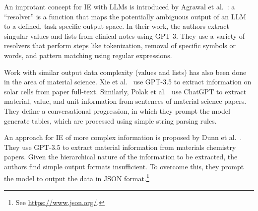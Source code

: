 An improtant concept for IE with LLMs is introduced by Agrawal et al.~\cite{Agrawal2022}: a ``resolver'' is a function that maps the potentially ambiguous output of an LLM to a defined, task specific output space. In their work, the authors extract singular values and lists from clinical notes using GPT-3. They use a variety of resolvers that perform steps like tokenization, removal of specific symbols or words, and pattern matching using regular expressions.

Work with similar output data complexity (values and lists) has also been done in the area of material science. Xie et al.~\cite{Xie2023} use GPT-3.5 to extract information on solar cells from paper full-text.
Similarly, Polak et al.~\cite{Polak2023} use ChatGPT %
to extract material, value, and unit information from sentences of material science papers. They define a conversational progression, in which they prompt the model generate tables, which are processed using simple string parsing rules.

An approach for IE of more complex information is proposed by Dunn et al.~\cite{Dunn2022}. They use GPT-3.5 to extract material information from materials chemistry papers. Given the hierarchical nature of the information to be extracted, the authors find simple output formats insufficient. To overcome this, they prompt the model to output the data in JSON format.\footnote{See \url{https://www.json.org/}.}

